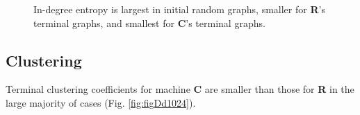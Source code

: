 \documentclass[twoside,twocolumn]{article}
\begin{document}
\begin{figure}
  \caption{In-degree entropy is largest in initial random graphs,
        smaller for \textbf{R}'s terminal graphs, and smallest for \textbf{C}'s terminal graphs.}
  \label{fig:figE}
\end{figure}

\subsection{Clustering}

Terminal clustering coefficients for machine \textbf{C} are smaller than those for \textbf{R} in
the large majority of cases (Fig. \ref{fig:figDd1024}).
\end{document}
